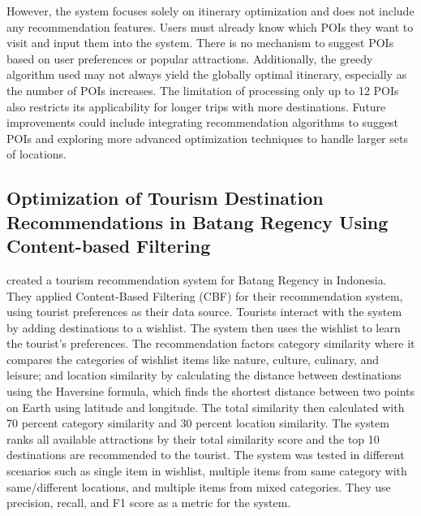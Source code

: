 However, the system focuses solely on itinerary optimization and does not include any recommendation features. Users must already know which POIs they want to visit and input them into the system. There is no mechanism to suggest POIs based on user preferences or popular attractions. Additionally, the greedy algorithm used may not always yield the globally optimal itinerary, especially as the number of POIs increases. The limitation of processing only up to 12 POIs also restricts its applicability for longer trips with more destinations. Future improvements could include integrating recommendation algorithms to suggest POIs and exploring more advanced optimization techniques to handle larger sets of locations.

\subsection{Optimization of Tourism Destination Recommendations in Batang Regency Using Content-based Filtering}

\textcite{Yulfihani2024} created a tourism recommendation system for Batang Regency in Indonesia. They applied Content-Based Filtering (CBF) for their recommendation system, using tourist preferences as their data source. Tourists interact with the system by adding destinations to a wishlist. The system then uses the wishlist to learn the tourist’s preferences. The recommendation factors category similarity where it compares the categories of wishlist items like nature, culture, culinary, and leisure; and location similarity by calculating the distance between destinations using the Haversine formula, which finds the shortest distance between two points on Earth using latitude and longitude.  The total similarity then calculated with 70 percent category similarity and 30 percent location similarity. The system ranks all available attractions by their total similarity score and the top 10 destinations are recommended to the tourist. The system was tested in different scenarios such as single item in wishlist, multiple items from same category with same/different locations, and multiple items from mixed categories. They use precision, recall, and F1 score as a metric for the system.

